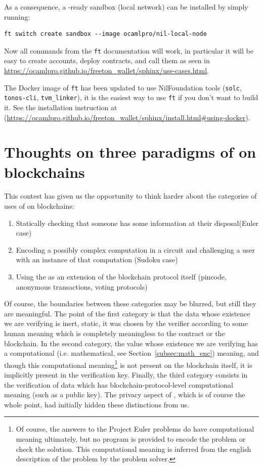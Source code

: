 \documentclass[10pt,a4paper]{article}
\begin{document}
As a consequence, a \zksnark-ready sandbox (local network) can be
installed by simply running:

\begin{lstlisting}[style=BashInputStyle]
ft switch create sandbox --image ocamlpro/nil-local-node
\end{lstlisting}

Now all commands from the \lstinline|ft| documentation will work, in
particular it will be easy to create accounts, deploy contracts, and
call them as seen in
\url{https://ocamlpro.github.io/freeton_wallet/sphinx/use-cases.html}.

The Docker image of \lstinline|ft| has been updated to use
NilFoundation tools
(\lstinline|solc|, \lstinline|tonos-cli|, \lstinline|tvm_linker|), it is
the easiest way to use \lstinline|ft| if you don't want to build
it. See the installation instruction at
(\url{https://ocamlpro.github.io/freeton_wallet/sphinx/install.html#using-docker}).

\section{Thoughts on three paradigms of \zksnarks{} on blockchains}
\label{sec_three_paradigms}
This contest has given us the opportunity to think harder about the categories of uses of \zksnarks{} on blockchains:
\begin{enumerate}
	\item Statically checking that someone has some information at their disposal(Euler case)
	\item Encoding a possibly complex computation in a circuit and challenging a user with an instance of that computation (Sudoku case)
	\item Using the \zksnark{} as an extension of the blockchain protocol itself (pincode, anonymous transactions, voting protocols)
\end{enumerate}

Of course, the boundaries between these categories may be blurred, but still they are meaningful. The point of the first category is that the data whose existence we are verifying is inert, static, it was chosen by the verifier according to some human meaning which is completely meaningless to the contract or the blockchain. In the second category, the value whose existence we are verifying has a computational (i.e. mathematical, see Section~\ref{subsec:math_enc}) meaning, and though this computational meaning\footnote{Of course, the answers to the Project Euler problems do have computational meaning ultimately, but no program is provided to encode the problem or check the solution. This computational meaning is inferred from the english description of the problem by the problem solver.} is not present on the blockchain itself, it is implicitly present in the verification key. Finally, the third category consists in the verification of data which has blockchain-protocol-level computational meaning (such as a public key). The privacy aspect of \zksnarks{}, which is of course the whole point, had initially hidden these distinctions from us.
\end{document}
